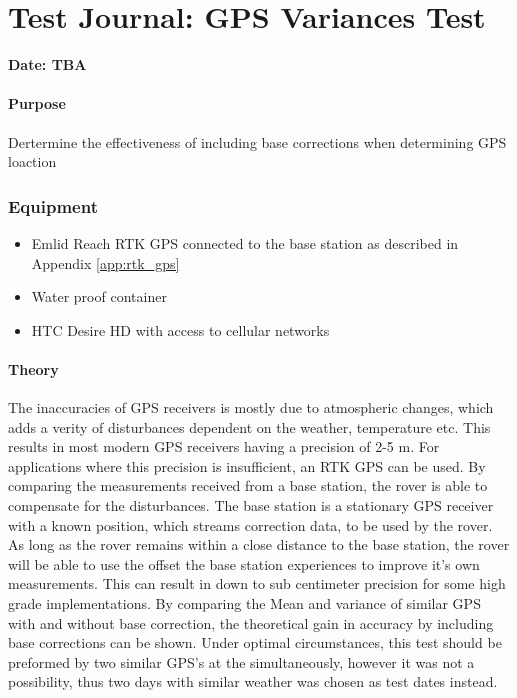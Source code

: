 \chapter{Test Journal: GPS Variances Test} \label{app:GPSImprovement}

\textbf{Date: TBA}

\subsubsection*{Purpose}
Dertermine the effectiveness of including base corrections when determining GPS loaction
\subsection*{Equipment}
\begin{itemize}
	\item Emlid Reach RTK GPS connected to the base station as described in Appendix \ref{app:rtk_gps}
    \item Water proof container
    \item HTC Desire HD with access to cellular networks
\end{itemize}

\subsubsection*{Theory}

The inaccuracies of GPS receivers is mostly due to atmospheric changes, which adds a verity of disturbances dependent on the weather, temperature etc.
This results in most modern GPS receivers having a precision of 2-5 m. 
For applications where this precision is insufficient, an RTK GPS can be used. 
By comparing the measurements received from a base station, the rover is able to compensate for the disturbances.
The base station is a stationary GPS receiver with a known position, which streams correction data, to be used by the rover. 
As long as the rover remains within a close distance to the base station, the rover will be able to use the offset the base station experiences to improve it's own measurements.
This can result in down to sub centimeter precision for some high grade implementations.
By comparing the Mean and variance of similar GPS with and without base correction, the theoretical gain in accuracy by including base corrections can be shown.
Under optimal circumstances, this test should be preformed by two similar GPS's at the simultaneously, however it was not a possibility, thus two days with similar weather was chosen as test dates instead.

